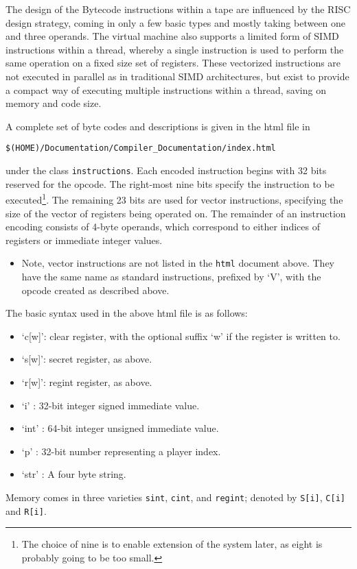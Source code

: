 The design of the Bytecode instructions within a tape are influenced
by the RISC design strategy, coming in only a few basic
types and mostly taking between one and three
operands. The virtual machine also supports a limited form of
SIMD instructions within a thread, whereby a single instruction is used to
perform the same operation on a fixed size set of registers.
These vectorized instructions are not executed in parallel
as in traditional SIMD architectures, but exist to provide a compact way of
executing multiple instructions within a thread, saving on memory
and code size.

A complete set of byte codes and descriptions is
given in the html file in 
\begin{center}
   \verb+$(HOME)/Documentation/Compiler_Documentation/index.html+
\end{center}
under the class \verb+instructions+.
Each encoded instruction begins with 32 bits reserved for the opcode.
The right-most nine bits specify the instruction to be executed\footnote{The choice of nine is to enable extension of the system later, as eight is probably going 
to be too small.}.
The remaining 23 bits are used for vector instructions, specifying the
size of the vector of registers being operated on.
The remainder of an instruction encoding consists of 4-byte operands, which
correspond to either indices of registers or immediate integer values.
\begin{itemize}
\item Note, vector instructions are not listed in the \verb+html+ document above.
They have the same name as standard instructions, prefixed by `V',
with the opcode created as described above.
\end{itemize}
The basic syntax used in the above html file is as follows:
\begin{itemize}
\item `c[w]': clear register, with the optional suffix `w' if the register is
written to.
\item `s[w]': secret register, as above.
\item `r[w]': regint register, as above.
\item `i'   : 32-bit integer signed immediate value.
\item `int' : 64-bit integer unsigned immediate value.
\item `p'   : 32-bit number representing a player index.
\item `str' : A four byte string.
\end{itemize}
Memory comes in three varieties \verb+sint+, \verb+cint+, and
\verb+regint+; denoted by \verb+S[i]+, \verb+C[i]+ and \verb+R[i]+.

